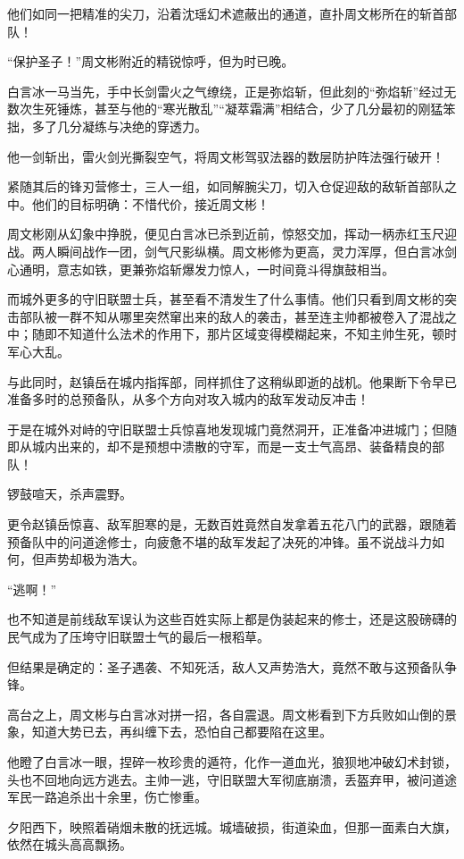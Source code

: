他们如同一把精准的尖刀，沿着沈瑶幻术遮蔽出的通道，直扑周文彬所在的斩首部队！

“保护圣子！”周文彬附近的精锐惊呼，但为时已晚。

白言冰一马当先，手中长剑雷火之气缭绕，正是弥焰斩，但此刻的“弥焰斩”经过无数次生死锤炼，甚至与他的“寒光散乱”“凝萃霜满”相结合，少了几分最初的刚猛笨拙，多了几分凝练与决绝的穿透力。

他一剑斩出，雷火剑光撕裂空气，将周文彬驾驭法器的数层防护阵法强行破开！

紧随其后的锋刃营修士，三人一组，如同解腕尖刀，切入仓促迎敌的敌斩首部队之中。他们的目标明确：不惜代价，接近周文彬！

周文彬刚从幻象中挣脱，便见白言冰已杀到近前，惊怒交加，挥动一柄赤红玉尺迎战。两人瞬间战作一团，剑气尺影纵横。周文彬修为更高，灵力浑厚，但白言冰剑心通明，意志如铁，更兼弥焰斩爆发力惊人，一时间竟斗得旗鼓相当。

而城外更多的守旧联盟士兵，甚至看不清发生了什么事情。他们只看到周文彬的突击部队被一群不知从哪里突然窜出来的敌人的袭击，甚至连主帅都被卷入了混战之中；随即不知道什么法术的作用下，那片区域变得模糊起来，不知主帅生死，顿时军心大乱。

与此同时，赵镇岳在城内指挥部，同样抓住了这稍纵即逝的战机。他果断下令早已准备多时的总预备队，从多个方向对攻入城内的敌军发动反冲击！

于是在城外对峙的守旧联盟士兵惊喜地发现城门竟然洞开，正准备冲进城门；但随即从城内出来的，却不是预想中溃散的守军，而是一支士气高昂、装备精良的部队！

锣鼓喧天，杀声震野。

更令赵镇岳惊喜、敌军胆寒的是，无数百姓竟然自发拿着五花八门的武器，跟随着预备队中的问道途修士，向疲惫不堪的敌军发起了决死的冲锋。虽不说战斗力如何，但声势却极为浩大。

“逃啊！”

也不知道是前线敌军误认为这些百姓实际上都是伪装起来的修士，还是这股磅礴的民气成为了压垮守旧联盟士气的最后一根稻草。

但结果是确定的：圣子遇袭、不知死活，敌人又声势浩大，竟然不敢与这预备队争锋。

高台之上，周文彬与白言冰对拼一招，各自震退。周文彬看到下方兵败如山倒的景象，知道大势已去，再纠缠下去，恐怕自己都要陷在这里。

他瞪了白言冰一眼，捏碎一枚珍贵的遁符，化作一道血光，狼狈地冲破幻术封锁，头也不回地向远方逃去。主帅一逃，守旧联盟大军彻底崩溃，丢盔弃甲，被问道途军民一路追杀出十余里，伤亡惨重。

夕阳西下，映照着硝烟未散的抚远城。城墙破损，街道染血，但那一面素白大旗，依然在城头高高飘扬。

